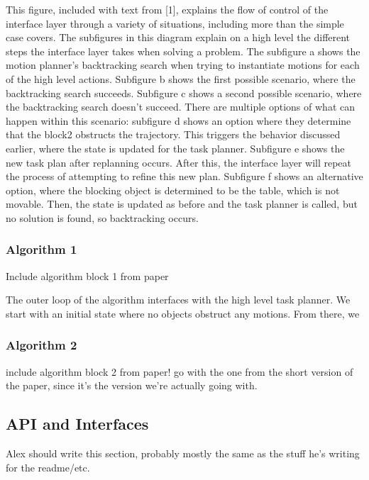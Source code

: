 \documentclass[12pt]{article}
\begin{document}
This figure, included with text from [1], explains the flow of control of the interface layer through a variety of situations, including more than the simple case covers.  The subfigures in this diagram explain on a high level the different steps the interface layer takes when solving a problem.  The subfigure a shows the motion planner's backtracking search when trying to instantiate motions for each of the high level actions.  Subfigure b shows the first possible scenario, where the backtracking search succeeds.  Subfigure c shows a second possible scenario, where the backtracking search doesn't succeed.  There are multiple options of what can happen within this scenario: subfigure d shows an option where they determine that the block2 obstructs the trajectory.  This triggers the behavior discussed earlier, where the state is updated for the task planner.  Subfigure e shows the new task plan after replanning occurs.  After this, the interface layer will repeat the process of attempting to refine this new plan.  Subfigure f shows an alternative option, where the blocking object is determined to be the table, which is not movable.  Then, the state is updated as before and the task planner is called, but no solution is found, so backtracking occurs.

\subsubsection{Algorithm 1}

Include algorithm block 1 from paper

The outer loop of the algorithm interfaces with the high level task planner.  We start with an initial state where no objects obstruct any motions.  From there, we 

\subsubsection{Algorithm 2}

include algorithm block 2 from paper!  go with the one from the short version of the paper, since it's the version we're actually going with.


\subsection{API and Interfaces}

Alex should write this section, probably mostly the same as the stuff he's writing for the readme/etc.
\end{document}
